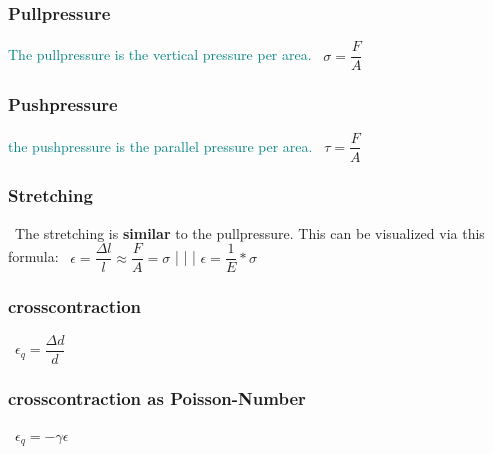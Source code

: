 \documentclass[main.tex,fontsize=8pt,paper=a4,paper=portrait,DIV=calc,]{scrartcl}
\begin{document}
\begin{multicols*}{2}
\subsubsection{Pullpressure} 
\textcolor{teal}{The pullpressure is the vertical pressure per area.}\newline
\, \newline
\large \( \sigma = \dfrac{F}{A} \)\newline
\normalsize 

\subsubsection{Pushpressure} 
\textcolor{teal}{the pushpressure is the parallel pressure per area.}\newline
\, \newline
\large \( \tau = \dfrac{F}{A} \)\newline
\normalsize 

\subsubsection{Stretching} 
\, \newline
The stretching is \textbf{similar} to the pullpressure.\newline
This can be visualized via this formula:\newline
\, \newline
\large \( \epsilon = \dfrac{\Delta l}{l} \approx \dfrac{F}{A} = \sigma \) | | | \large \( \epsilon = \dfrac{1}{E} * \sigma \)
\, \newline
\normalsize 

\subsubsection{crosscontraction}
\, \newline
\large \( \epsilon_q = \dfrac{\Delta d}{d} \)\newline
\, \newline
\normalsize 

\subsubsection{crosscontraction as Poisson-Number}
\, \newline
\large \( \epsilon_q = -\gamma \epsilon \)\newline
\, \newline
\normalsize 


\end{multicols*}
\end{document}
